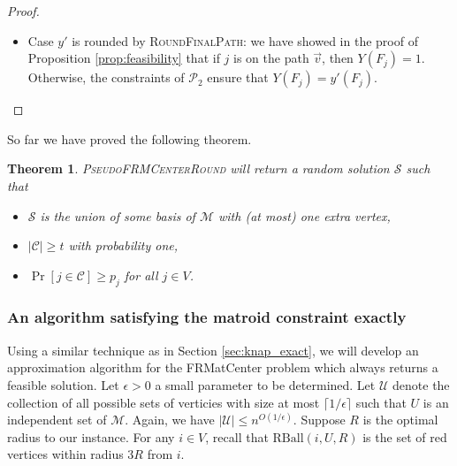 \documentclass[a4paper,11pt]{article}
\newtheorem{theorem}{Theorem}[section]
\newcommand{\C}{\mathcal{C}}
\renewcommand{\S}{\mathcal{S}}
\newcommand{\U}{\mathcal{U}}
\newcommand{\M}{\mathcal{M}}
\renewcommand{\P}{\mathcal{P}}
\newcommand{\RBall}{\mathrm{RBall}}
\begin{document}
\begin{proof}
\begin{itemize}
	\item Case $y'$ is rounded by \textsc{RoundFinalPath}: we have showed in the proof of Proposition \ref{prop:feasibility} that if $j$ is on the path $\vec{v}$, then $Y(F_j) = 1$. Otherwise, the constraints of $\P_2$ ensure that $Y(F_j) = y'(F_j)$.
\end{itemize}

\end{proof}

So far we have proved the following theorem.
\begin{theorem}
\textsc{PseudoFRMCenterRound} will return a random solution $\S$ such that 
\begin{itemize}
	\item $\S$ is the union of some basis of $\M$ with (at most) one extra vertex,
	\item $|\C| \geq t$ with probability one,
	\item $\Pr[j \in \C] \geq p_j$ for all $j \in V$.
\end{itemize}
\label{thm:pseudo_matround}
\end{theorem}








\subsubsection{An algorithm satisfying the matroid constraint exactly}

Using a similar technique as in Section \ref{sec:knap_exact}, we will develop an approximation algorithm for the \textsf{FRMatCenter} problem which always returns a feasible solution. Let $\epsilon > 0$ a small parameter to be determined. Let $\U$ denote the collection of all possible sets of verticies with size at most $\lceil 1/\epsilon \rceil$ such that $U$ is an independent set of $\M$. Again, we have $|\U| \leq n^{O(1/\epsilon)}$. Suppose $R$ is the optimal radius to our instance. For any $i \in V$, recall that $\RBall(i, U, R)$ is the set of red vertices within radius $3R$ from $i$.
 
\end{document}
